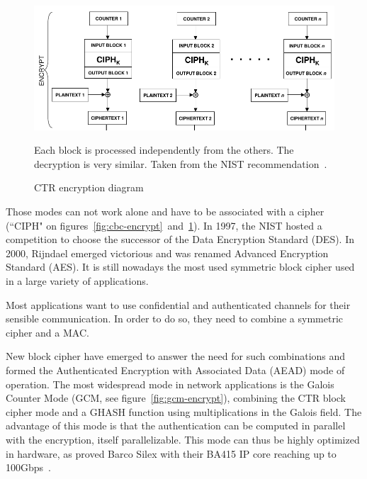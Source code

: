 \begin{figure}
\includegraphics[width=\textwidth]{nist-ctr}
\caption{CTR encryption diagram}{Each block is processed independently from the others. The decryption is very similar. Taken from the NIST recommendation~\cite{nist-sp800-38A}.}
\label{fig:ctr-encrypt}
\end{figure}

Those modes can not work alone and have to be associated with a cipher (``CIPH" on figures~\ref{fig:cbc-encrypt}~and~\ref{fig:ctr-encrypt}).
In 1997, the NIST hosted a competition to choose the successor of the Data Encryption Standard (DES).
In 2000, Rijndael emerged victorious and was renamed Advanced Encryption Standard (AES).
It is still nowadays the most used symmetric block cipher used in a large variety of applications.\newline{}

Most applications want to use confidential and authenticated channels for their sensible communication.
In order to do so, they need to combine a symmetric cipher and a MAC.

\noindent New block cipher have emerged to answer the need for such combinations and formed the Authenticated Encryption with Associated Data (AEAD) mode of operation.
The most widespread mode in network applications is the Galois Counter Mode (GCM, see figure~\ref{fig:gcm-encrypt}), combining the CTR block cipher mode and a GHASH function using multiplications in the Galois field.
The advantage of this mode is that the authentication can be computed in parallel with the encryption, itself parallelizable.
This mode can thus be highly optimized in hardware, as proved Barco Silex with their BA415 IP core reaching up to 100Gbps~\cite{barco-ba415}.

